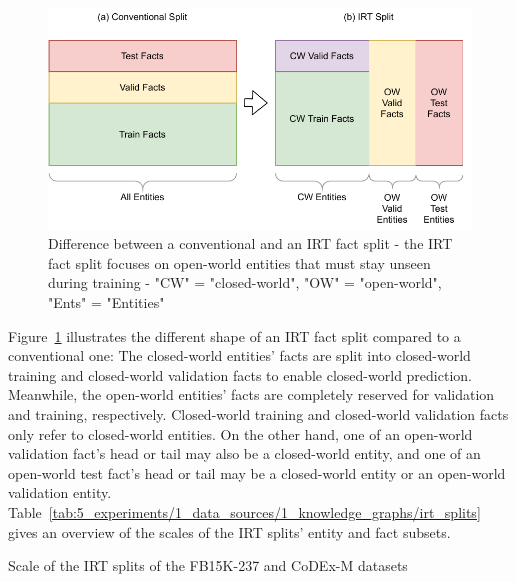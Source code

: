 \begin{figure}
    \centering
    \includegraphics[width=\textwidth]{5_experiments/1_data_sources/1_knowledge_graphs/irt_split}
    \caption{Difference between a conventional and an IRT fact split - the IRT fact split focuses on open-world entities that must stay unseen during training - "CW" = "closed-world", "OW" = "open-world", "Ents" = "Entities"}
    \label{fig:5_experiments/1_data_sources/1_knowledge_graphs/irt_split}
\end{figure}

Figure~\ref{fig:5_experiments/1_data_sources/1_knowledge_graphs/irt_split} illustrates the different shape of an IRT fact split compared to a conventional one: The closed-world entities' facts are split into closed-world training and closed-world validation facts to enable closed-world prediction. Meanwhile, the open-world entities' facts are completely reserved for validation and training, respectively. Closed-world training and closed-world validation facts only refer to closed-world entities. On the other hand, one of an open-world validation fact's head or tail may also be a closed-world entity, and one of an open-world test fact's head or tail may be a closed-world entity or an open-world validation entity. Table~\ref{tab:5_experiments/1_data_sources/1_knowledge_graphs/irt_splits} gives an overview of the scales of the IRT splits' entity and fact subsets.

\begin{table}[h]
    \centering
    
    \caption{Scale of the IRT splits of the FB15K-237 and CoDEx-M datasets}
    \label{tab:5_experiments/1_data_sources/1_knowledge_graphs/irt_splits}
\end{table}
